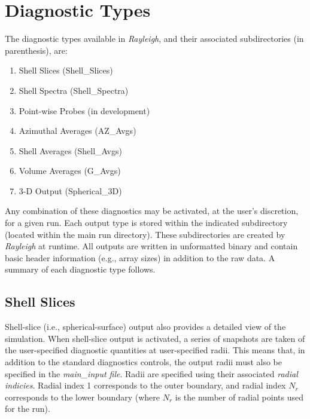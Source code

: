 \documentclass[12pt,letterpaper]{article}
\begin{document}
\section{Diagnostic Types}\label{sec:dtypes}
The diagnostic types available in \textit{Rayleigh}, and their associated subdirectories (in parenthesis), are:
\begin{enumerate}
\item Shell Slices (Shell\_Slices)
\item Shell Spectra (Shell\_Spectra)
\item Point-wise Probes (in development)
\item Azimuthal Averages (AZ\_Avgs)
\item Shell Averages (Shell\_Avgs)
\item Volume Averages (G\_Avgs)
\item 3-D Output (Spherical\_3D)
\end{enumerate}
Any combination of these diagnostics may be activated, at the user's discretion, for a given run.  Each output type is stored within the indicated subdirectory (located within the main run directory).  These subdirectories are created by \textit{Rayleigh} at runtime.  All outputs are written in unformatted binary and contain basic header information (e.g., array sizes) in addition to the raw data.  A summary of each diagnostic type follows.


\subsection{Shell Slices}
Shell-slice (i.e., spherical-surface) output also provides a detailed view of the simulation.  When shell-slice output is activated, a series of snapshots are taken of the user-specified diagnostic quantities at user-specified radii.  This means that, in addition to the standard diagnostics controls, the output radii must also be specified in the \textit{main\_input file}. Radii are specified using their associated \textit{radial indicies}.  Radial index 1 corresponds to the outer boundary, and radial index $N_r$ corresponds to the lower boundary (where $N_r$ is the number of radial points used for the run). 
\end{document}

